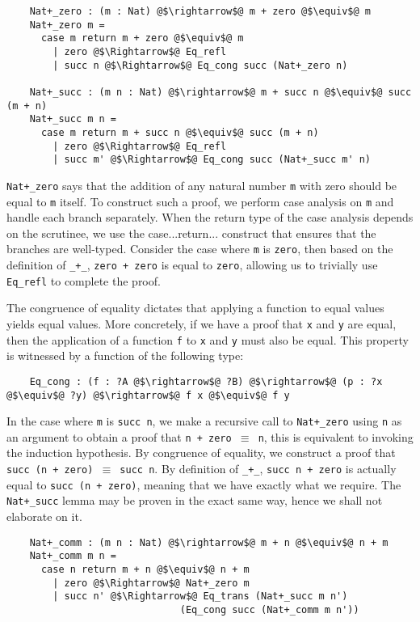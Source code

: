 \documentclass[12pt,twoside,maitrise]{dms}
\theoremstyle{definition}
\numberwithin{equation}{section}
\numberwithin{table}{chapter}
\numberwithin{figure}{chapter}
\newcommand\kw[1] {\textsf{#1}}
\newcommand\id[1] {\texttt{#1}}
\newcommand\fn[1] {\texttt{#1}}
\begin{document}
\begin{verbatim}
    Nat+_zero : (m : Nat) @$\rightarrow$@ m + zero @$\equiv$@ m
    Nat+_zero m =
      case m return m + zero @$\equiv$@ m
        | zero @$\Rightarrow$@ Eq_refl
        | succ n @$\Rightarrow$@ Eq_cong succ (Nat+_zero n)

    Nat+_succ : (m n : Nat) @$\rightarrow$@ m + succ n @$\equiv$@ succ (m + n)
    Nat+_succ m n =
      case m return m + succ n @$\equiv$@ succ (m + n)
        | zero @$\Rightarrow$@ Eq_refl
        | succ m' @$\Rightarrow$@ Eq_cong succ (Nat+_succ m' n)
\end{verbatim}

\id{Nat+\_zero} says that the addition of any natural number \id{m} with zero
should be equal to \id{m} itself. To construct such a proof, we perform case
analysis on \id{m} and handle each branch separately. When the return type of
the case analysis depends on the scrutinee, we use the \kw{case...return...}
construct that ensures that the branches are well-typed. Consider the case where
\id{m} is \id{zero}, then based on the definition of \id{\_+\_}, \fn{zero +
  zero} is equal to \id{zero}, allowing us to trivially use \id{Eq\_refl} to
complete the proof.

The congruence of equality dictates that applying a function to equal values
yields equal values. More concretely, if we have a proof that \id{x} and \id{y}
are equal, then the application of a function \id{f} to \id{x} and \id{y} must
also be equal. This property is witnessed by a function of the following type:

\begin{verbatim}
    Eq_cong : (f : ?A @$\rightarrow$@ ?B) @$\rightarrow$@ (p : ?x @$\equiv$@ ?y) @$\rightarrow$@ f x @$\equiv$@ f y
\end{verbatim}

In the case where \id{m} is \fn{succ n}, we make a recursive call to
\id{Nat+\_zero} using \id{n} as an argument to obtain a proof that \fn{n + zero
  $\equiv$ n}, this is equivalent to invoking the induction hypothesis. By
congruence of equality, we construct a proof that \fn{succ (n + zero) $\equiv$
  succ n}. By definition of \id{\_+\_}, \fn{succ n + zero} is actually equal to
\fn{succ (n + zero)}, meaning that we have exactly what we require. The
\id{Nat+\_succ} lemma may be proven in the exact same way, hence we shall not
elaborate on it.

\begin{verbatim}
    Nat+_comm : (m n : Nat) @$\rightarrow$@ m + n @$\equiv$@ n + m
    Nat+_comm m n =
      case n return m + n @$\equiv$@ n + m
        | zero @$\Rightarrow$@ Nat+_zero m
        | succ n' @$\Rightarrow$@ Eq_trans (Nat+_succ m n')
                              (Eq_cong succ (Nat+_comm m n'))
\end{verbatim}
\end{document}
